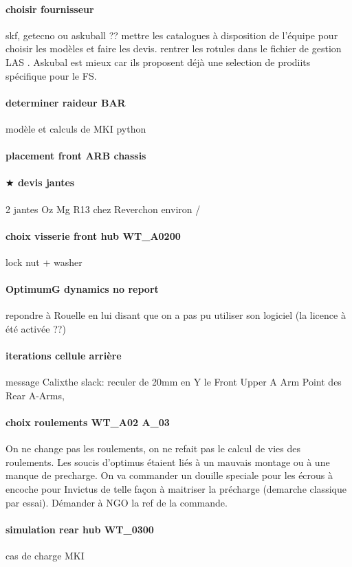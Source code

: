 \paragraph{choisir fournisseur} skf, getecno ou askuball ?? mettre les catalogues à disposition de l'équipe pour choisir les modèles et faire les devis. rentrer les rotules dans le fichier de gestion LAS . Askubal est mieux car ils proposent déjà une selection de prodiits spécifique pour le FS. 
\paragraph{determiner raideur BAR} modèle et calculs de MKI python
\paragraph{placement front ARB chassis} 
\paragraph{$\bigstar$ devis jantes} 2 jantes Oz Mg R13 chez Reverchon environ /%
\paragraph{choix visserie front hub WT\_A0200} lock nut + washer 
\paragraph{OptimumG dynamics no report} repondre à Rouelle en lui disant que on a pas pu utiliser son logiciel (la licence à été activée ??)
\paragraph{iterations cellule arrière} message Calixthe slack: reculer de 20mm en Y le Front Upper A Arm Point  des Rear A-Arms,
\paragraph{choix roulements WT\_A02 A\_03} On ne change pas les roulements, on ne refait pas le calcul de vies des roulements. Les soucis d'optimus étaient liés à un mauvais montage ou à une manque de precharge. On va commander un douille speciale pour les écrous à encoche pour Invictus de telle façon à maitriser la précharge (demarche classique par essai). Démander à NGO la ref de la commande.
\paragraph{simulation rear hub WT\_0300} cas de charge MKI
